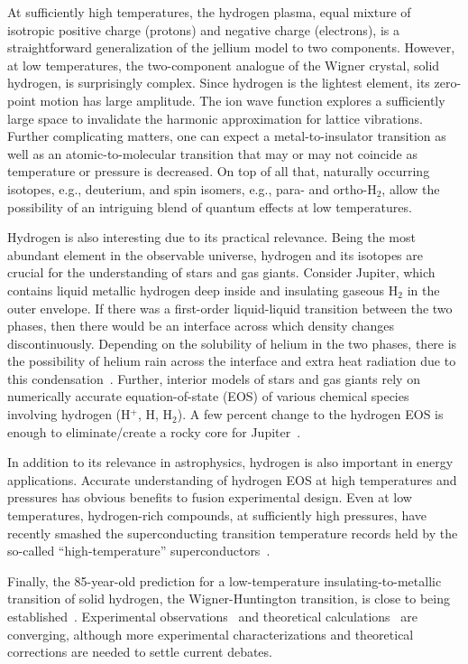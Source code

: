 At sufficiently high temperatures, the hydrogen plasma, equal mixture of isotropic positive charge (protons) and negative charge (electrons), is a straightforward generalization of the jellium model to two components. However, at low temperatures, the two-component analogue of the Wigner crystal, solid hydrogen, is surprisingly complex.
Since hydrogen is the lightest element, its zero-point motion has large amplitude. The ion wave function explores a sufficiently large space to invalidate the harmonic approximation for lattice vibrations.
Further complicating matters, one can expect a metal-to-insulator transition as well as an atomic-to-molecular transition that may or may not coincide as temperature or pressure is decreased.
On top of all that, naturally occurring isotopes, e.g., deuterium, and spin isomers, e.g., para- and ortho-H$_2$, allow the possibility of an intriguing blend of quantum effects at low temperatures.

Hydrogen is also interesting due to its practical relevance. Being the most abundant element in the observable universe, hydrogen and its isotopes are crucial for the understanding of stars and gas giants.
Consider Jupiter, which contains liquid metallic hydrogen deep inside and insulating gaseous H$_2$ in the outer envelope. If there was a first-order liquid-liquid transition between the two phases, then there would be an interface across which density changes discontinuously.
Depending on the solubility of helium in the two phases, there is the possibility of helium rain across the interface and extra heat radiation due to this condensation~\cite{Militzer_thesis}.
Further, interior models of stars and gas giants rely on numerically accurate equation-of-state (EOS) of various chemical species involving hydrogen (H$^+$, H, H$_2$).
A few percent change to the hydrogen EOS is enough to eliminate/create a rocky core for Jupiter~\cite{Hubbard2016}.

In addition to its relevance in astrophysics, hydrogen is also important in energy applications. Accurate understanding of hydrogen EOS at high temperatures and pressures has obvious benefits to fusion experimental design.
Even at low temperatures, hydrogen-rich compounds, at sufficiently high pressures, have recently smashed the superconducting transition temperature records held by the so-called ``high-temperature'' superconductors~\cite{Drozdov2015,Errea2020}.

Finally, the 85-year-old prediction for a low-temperature insulating-to-metallic transition of solid hydrogen, the Wigner-Huntington transition, is close to being established~\cite{Wigner1935,Dias2016,Loubeyre2020}.
Experimental observations~\cite{Dias2016,Loubeyre2020} and theoretical calculations~\cite{McMinis2015,Gorelov2019} are converging, although more experimental characterizations and theoretical corrections are needed to settle current debates.


